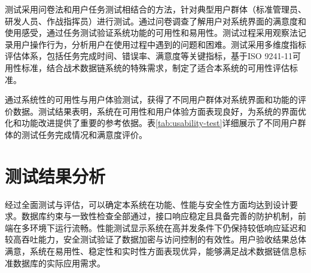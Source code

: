 测试采用问卷法和用户任务测试相结合的方法，针对典型用户群体（标准管理员、研发人员、作战指挥员）进行测试。通过问卷调查了解用户对系统界面的满意度和使用感受，通过任务测试验证系统功能的可用性和易用性。测试过程采用观察法记录用户操作行为，分析用户在使用过程中遇到的问题和困难。测试采用多维度指标评估体系，包括任务完成时间、错误率、满意度等关键指标，基于ISO 9241-11可用性标准，结合战术数据链系统的特殊需求，制定了适合本系统的可用性评估标准。

通过系统性的可用性与用户体验测试，获得了不同用户群体对系统界面和功能的评价数据。测试结果表明，系统在可用性和用户体验方面表现良好，为系统的界面优化和功能改进提供了重要的参考依据。表\ref{tab:usability-test}详细展示了不同用户群体的测试任务完成情况和满意度评价。

\begin{table}[H]
\centering
\caption{可用性与用户体验测试结果}
\label{tab:usability-test}
\end{table}



\section{测试结果分析}

经过全面测试与评估，可以确定本系统在功能、性能与安全性方面均达到设计要求。数据库约束与一致性检查全部通过，接口响应稳定且具备完善的防护机制，前端在多环境下运行流畅。性能测试显示系统在高并发条件下仍保持较低响应延迟和较高吞吐能力，安全测试验证了数据加密与访问控制的有效性。用户验收结果总体满意，系统在易用性、稳定性和实时性方面表现优异，能够满足战术数据链信息标准数据库的实际应用需求。
